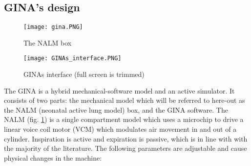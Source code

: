\documentclass[12pt, openany, oneside]{book}
\begin{document}
\subsection{GINA's design}

\begin{figure}[h!]
		
	\centering	
	\texttt{[image: gina.PNG]}	
		\caption[NALM box]{The NALM box} 
		\label{fig:nalm}	
	\end{figure}
	\begin{figure}[h]
	\centering	
		\texttt{[image: GINAs\_interface.PNG]}	
		\caption{GINAs interface (full screen is trimmed)}
		\label{fig:gina}	
\end{figure}	
	


The GINA is a hybrid mechanical-software model and an active simulator. It consists of two parts: the mechanical model which will be referred to here-out as the NALM (neonatal active lung model) box, and the GINA software. The NALM (fig. \ref{fig:nalm}) is a single compartment model which uses a microchip to drive a linear voice coil motor (VCM) which modulates air movement in and out of a cylinder. Inspiration is active and expiration is passive, which is in line with with the majority of the literature. The following parameters are adjustable and cause physical changes in the machine:
\end{document}
